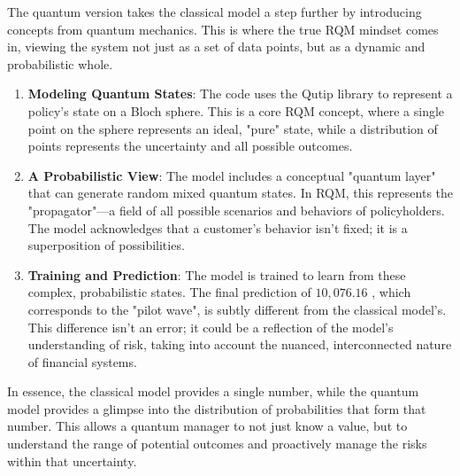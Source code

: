\documentclass{article}
\begin{document}
The quantum version takes the classical model a step further by introducing concepts from quantum mechanics. This is where the true RQM mindset comes in, viewing the system not just as a set of data points, but as a dynamic and probabilistic whole.
\begin{enumerate}
\item \textbf{Modeling Quantum States}: The code uses the Qutip library to represent a policy's state on a Bloch sphere. This is a core RQM concept, where a single point on the sphere represents an ideal, "pure" state, while a distribution of points represents the uncertainty and all possible outcomes.
\item \textbf{A Probabilistic View}: The model includes a conceptual "quantum layer" that can generate random mixed quantum states. In RQM, this represents the "propagator"---a field of all possible scenarios and behaviors of policyholders. The model acknowledges that a customer's behavior isn't fixed; it is a superposition of possibilities.
\item \textbf{Training and Prediction}: The model is trained to learn from these complex, probabilistic states. The final prediction of $10,076.16$ , which corresponds to the "pilot wave", is subtly different from the classical model's. This difference isn't an error; it could be a reflection of the model's understanding of risk, taking into account the nuanced, interconnected nature of financial systems.
\end{enumerate}
In essence, the classical model provides a single number, while the quantum model provides a glimpse into the distribution of probabilities that form that number. This allows a quantum manager to not just know a value, but to understand the range of potential outcomes and proactively manage the risks within that uncertainty.
\end{document}
